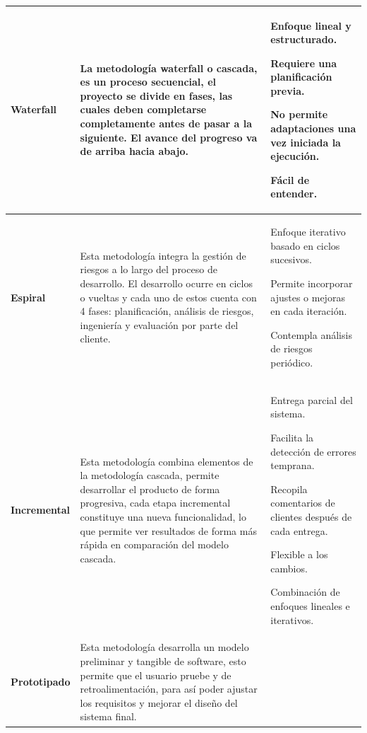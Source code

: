 {\begin{longtable}{|L{2.6cm}|L{6.65cm}|L{5.4cm}|}
\endfoot
\textbf{Waterfall} & La metodología waterfall o cascada, es un proceso
secuencial, el proyecto se divide en fases, las cuales deben completarse
completamente antes de pasar a la siguiente. El avance del progreso va de
arriba hacia abajo. &
\begin{tablista}
  \item Enfoque lineal y estructurado.
  \item Requiere una planificación previa.
  \item No permite adaptaciones una vez iniciada la ejecución.
  \item Fácil de entender.
\end{tablista} \\
\hline
\textbf{Espiral} & Esta metodología integra la gestión de riesgos a lo largo
del proceso de desarrollo. El desarrollo ocurre en ciclos o vueltas y cada uno
de estos cuenta con 4 fases: planificación, análisis de riesgos, ingeniería y
evaluación por parte del cliente. &
\begin{tablista}
  \item Enfoque iterativo basado en ciclos sucesivos.
  \item Permite incorporar ajustes o mejoras en cada iteración.
  \item Contempla análisis de riesgos periódico.
\end{tablista} \\
\hline
\textbf{Incremental} & Esta metodología combina elementos de la metodología
cascada, permite desarrollar el producto de forma progresiva, cada etapa
incremental constituye una nueva funcionalidad, lo que permite ver resultados
de forma más rápida en comparación del modelo cascada. &
\begin{tablista}
  \item Entrega parcial del sistema.
  \item Facilita la detección de errores temprana.
  \item Recopila comentarios de clientes después de cada entrega.
  \item Flexible a los cambios.
  \item Combinación de enfoques lineales e iterativos.
\end{tablista} \\
\hline
\textbf{Prototipado} & Esta metodología desarrolla un modelo preliminar y
tangible de software, esto permite que el usuario pruebe y de
retroalimentación, para así poder ajustar los requisitos y mejorar el diseño
del sistema final. &
\begin{tablista}

\end{tablista}
\end{longtable}}
